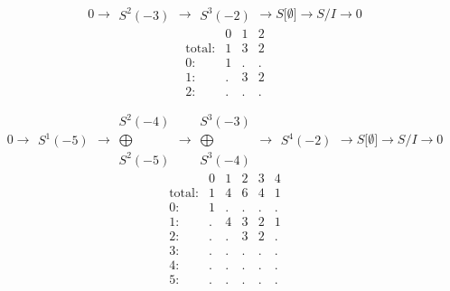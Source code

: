 \documentclass[12pt,a3paper,landscape]{amsart}
\numberwithin{equation}{section}
\theoremstyle{plain}
\theoremstyle{definition}
\begin{document}
$$
0 \rightarrow \begin{matrix}
S^{2}(-3)
\end{matrix}
\rightarrow\begin{matrix}
S^{3}(-2)
\end{matrix}
\rightarrow S \lbrack \emptyset \rbrack \rightarrow S/I \rightarrow 0
$$
$$
\begin{matrix}
& 0 & 1 & 2 \\
\text{total}: & 1 & 3 & 2 \\
0: & 1 & . & . \\
1: & . & 3 & 2 \\
2: & . & . & .
\end{matrix}
$$

$$
0 \rightarrow \begin{matrix}
S^{1}(-5)
\end{matrix}
\rightarrow\begin{matrix}
S^{2}(-4)\\ \bigoplus \\
S^{2}(-5)
\end{matrix}
\rightarrow\begin{matrix}
S^{3}(-3)\\ \bigoplus \\
S^{3}(-4)
\end{matrix}
\rightarrow\begin{matrix}
S^{4}(-2)
\end{matrix}
\rightarrow S \lbrack \emptyset \rbrack \rightarrow S/I \rightarrow 0
$$
$$
\begin{matrix}
& 0 & 1 & 2 & 3 & 4 \\
\text{total}: & 1 & 4 & 6 & 4 & 1 \\
0: & 1 & . & . & . & . \\
1: & . & 4 & 3 & 2 & 1 \\
2: & . & . & 3 & 2 & . \\
3: & . & . & . & . & . \\
4: & . & . & . & . & . \\
5: & . & . & . & . & .
\end{matrix}
$$
\end{document}
